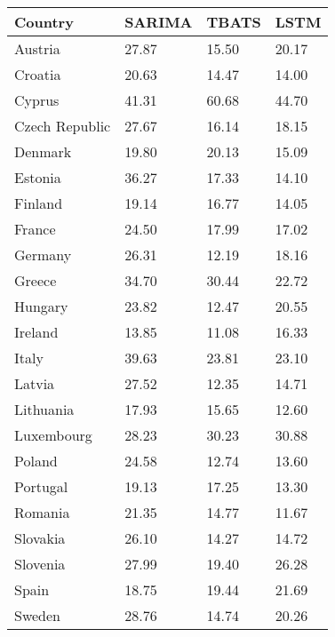 \begin{tabular}{llll}
\toprule
Country & SARIMA & TBATS & LSTM \\
\midrule
Austria & 27.87 & 15.50 & 20.17 \\
Croatia & 20.63 & 14.47 & 14.00 \\
Cyprus & 41.31 & 60.68 & 44.70 \\
Czech Republic & 27.67 & 16.14 & 18.15 \\
Denmark & 19.80 & 20.13 & 15.09 \\
Estonia & 36.27 & 17.33 & 14.10 \\
Finland & 19.14 & 16.77 & 14.05 \\
France & 24.50 & 17.99 & 17.02 \\
Germany & 26.31 & 12.19 & 18.16 \\
Greece & 34.70 & 30.44 & 22.72 \\
Hungary & 23.82 & 12.47 & 20.55 \\
Ireland & 13.85 & 11.08 & 16.33 \\
Italy & 39.63 & 23.81 & 23.10 \\
Latvia & 27.52 & 12.35 & 14.71 \\
Lithuania & 17.93 & 15.65 & 12.60 \\
Luxembourg & 28.23 & 30.23 & 30.88 \\
Poland & 24.58 & 12.74 & 13.60 \\
Portugal & 19.13 & 17.25 & 13.30 \\
Romania & 21.35 & 14.77 & 11.67 \\
Slovakia & 26.10 & 14.27 & 14.72 \\
Slovenia & 27.99 & 19.40 & 26.28 \\
Spain & 18.75 & 19.44 & 21.69 \\
Sweden & 28.76 & 14.74 & 20.26 \\
\bottomrule
\end{tabular}
